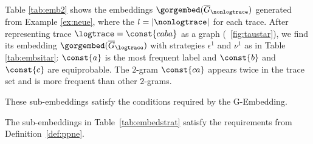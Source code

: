 \begin{example} 
	Table \ref{tab:emb2} shows the embeddings $\gorgembed(\overline{G}_\nonlogtrace)$ generated from Example \ref{ex:neue}, where the $l=|\nonlogtrace|$ for each \unravelled trace.
	After representing trace $\logtrace=\const{caba}$ as a graph (\figurename~\ref{fig:taustar}), we find its
	embedding $\gorgembed(\overline{G}_{\logtrace})$ with strategies $\epsilon^1$ and $\nu^1$ 
	{as} in Table \ref{tab:embsitar}: $\const{a}$ is the most frequent label and $\const{b}$ and $\const{c}$ are equiprobable. 
	The $2$-gram $\const{ca}$ appears twice in the trace set and is more frequent than other $2$-grams.
\end{example}
%
These sub-embeddings satisfy the conditions required by the G-Embedding.
\begin{lemma}
	\label{lem:addedForOurPropos}
	The sub-embeddings in Table~\ref{tab:embedstrat} satisfy the requirements from Definition~\ref{def:ppne}.
\end{lemma}


